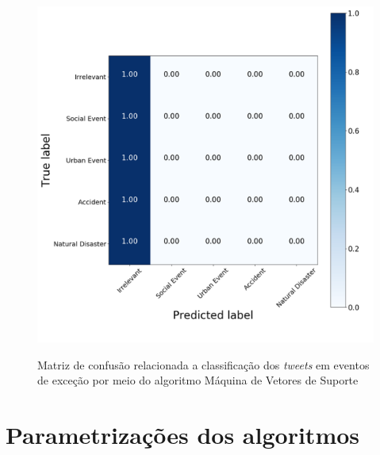 \documentclass[
	12pt,				%
	oneside,			%
	a4paper,			%
	english,			%
	brazil				%
	]{abntex2ppgsi}
\begin{document}
{{\begin{apendicesenv}
\begin{figure}[!htb]
	\centering
 	  \caption{Matriz de confusão relacionada a classificação dos \textit{tweets} em eventos de exceção por meio do algoritmo Máquina de Vetores de Suporte}
		\includegraphics[width=1\linewidth]{images/confusion_matrix_svm.png}
	\label{fig:confusion_matrix_svm}
\end{figure}

\chapter{Parametrizações dos algoritmos}
\label{apendiceF}


\end{apendicesenv}}}
\end{document}
